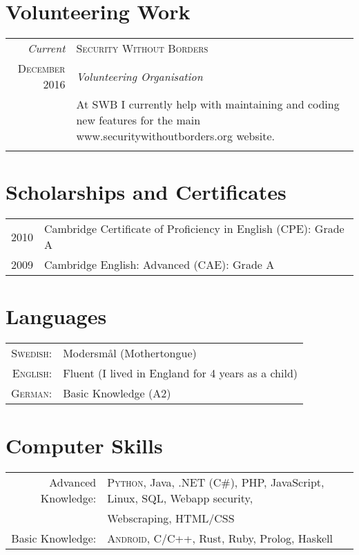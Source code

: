 \documentclass[a4paper,10pt]{article}
\begin{document}
\section{Volunteering Work}
\begin{tabular}{r|p{11cm}}
 \emph{Current} & \textsc{Security Without Borders} \\
 \textsc{December 2016}&\emph{Volunteering Organisation}\\
 &\footnotesize{At SWB I currently help with maintaining and coding new features for the main www.securitywithoutborders.org website.} \\ \multicolumn{2}{c}{} \\
 
\end{tabular}

\section{Scholarships and Certificates}
\begin{tabular}{rl}
 \textsc{2010} & Cambridge Certificate of Proficiency in English (CPE): Grade A \\
\textsc{2009} & Cambridge English: Advanced (CAE): Grade A
\end{tabular}

\section{Languages}
\begin{tabular}{rl}
\textsc{Swedish:}& Modersmål (Mothertongue)\\
\textsc{English:}& Fluent (I lived in England for 4 years as a child)\\
\textsc{German:}& Basic Knowledge (A2)\\
\end{tabular}

\section{Computer Skills}
\begin{tabular}{rl}
 Advanced Knowledge:& \textsc{Python}, Java, .NET (C\#), PHP, JavaScript, Linux, SQL, Webapp security,\\& Webscraping, HTML/CSS\\
 Basic Knowledge:&  \textsc{Android}, C/C++, Rust, Ruby, Prolog, Haskell  \\
\end{tabular}
\end{document}

